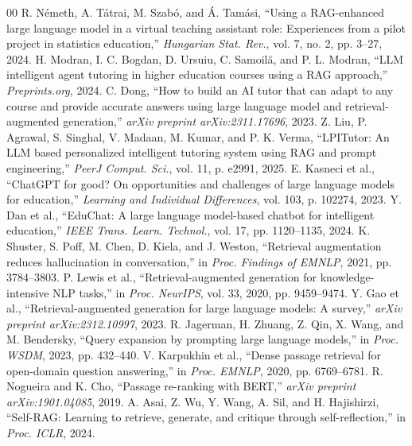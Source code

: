 \documentclass[conference]{IEEEtran}
\begin{document}
\begin{thebibliography}{00}
 R. N\'{e}meth, A. T\'{a}trai, M. Szab\'{o}, and \'{A}. Tam\'{a}si, ``Using a RAG-enhanced large language model in a virtual teaching assistant role: Experiences from a pilot project in statistics education,'' \textit{Hungarian Stat. Rev.}, vol. 7, no. 2, pp. 3--27, 2024.
 H. Modran, I. C. Bogdan, D. Ursuiu, C. Samoil\u{a}, and P. L. Modran, ``LLM intelligent agent tutoring in higher education courses using a RAG approach,'' \textit{Preprints.org}, 2024.
 C. Dong, ``How to build an AI tutor that can adapt to any course and provide accurate answers using large language model and retrieval-augmented generation,'' \textit{arXiv preprint arXiv:2311.17696}, 2023.
 Z. Liu, P. Agrawal, S. Singhal, V. Madaan, M. Kumar, and P. K. Verma, ``LPITutor: An LLM based personalized intelligent tutoring system using RAG and prompt engineering,'' \textit{PeerJ Comput. Sci.}, vol. 11, p. e2991, 2025.
 E. Kasneci et al., ``ChatGPT for good? On opportunities and challenges of large language models for education,'' \textit{Learning and Individual Differences}, vol. 103, p. 102274, 2023.
 Y. Dan et al., ``EduChat: A large language model-based chatbot for intelligent education,'' \textit{IEEE Trans. Learn. Technol.}, vol. 17, pp. 1120--1135, 2024.
 K. Shuster, S. Poff, M. Chen, D. Kiela, and J. Weston, ``Retrieval augmentation reduces hallucination in conversation,'' in \textit{Proc. Findings of EMNLP}, 2021, pp. 3784--3803.
 P. Lewis et al., ``Retrieval-augmented generation for knowledge-intensive NLP tasks,'' in \textit{Proc. NeurIPS}, vol. 33, 2020, pp. 9459--9474.
 Y. Gao et al., ``Retrieval-augmented generation for large language models: A survey,'' \textit{arXiv preprint arXiv:2312.10997}, 2023.
 R. Jagerman, H. Zhuang, Z. Qin, X. Wang, and M. Bendersky, ``Query expansion by prompting large language models,'' in \textit{Proc. WSDM}, 2023, pp. 432--440.
 V. Karpukhin et al., ``Dense passage retrieval for open-domain question answering,'' in \textit{Proc. EMNLP}, 2020, pp. 6769--6781.
 R. Nogueira and K. Cho, ``Passage re-ranking with BERT,'' \textit{arXiv preprint arXiv:1901.04085}, 2019.
 A. Asai, Z. Wu, Y. Wang, A. Sil, and H. Hajishirzi, ``Self-RAG: Learning to retrieve, generate, and critique through self-reflection,'' in \textit{Proc. ICLR}, 2024.

\end{thebibliography}
\end{document}
